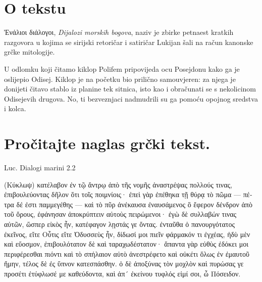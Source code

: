


\section*{O tekstu}

Ἐνάλιοι διάλογοι, \textit{Dijalozi morskih bogova}, naziv je zbirke petnaest kratkih razgovora u kojima se sirijski retoričar i satiričar Lukijan šali na račun kanonske grčke mitologije.

U odlomku koji čitamo kiklop Polifem pripovijeda ocu Posejdonu kako ga je oslijepio Odisej. Kiklop je na početku bio prilično samouvjeren: za njega je donijeti čitavo stablo iz planine tek sitnica, isto kao i obračunati se s nekolicinom Odisejevih drugova. No, ti bezveznjaci nadmudrili su ga pomoću opojnog sredstva i kolca.



\section*{Pročitajte naglas grčki tekst.}

Luc. Dialogi marini 2.2


\medskip


{\large

\begin{greek}

\noindent (Κύκλωψ) κατέλαβον ἐν τῷ ἄντρῳ ἀπὸ τῆς νομῆς ἀναστρέψας πολλούς τινας, ἐπιβουλεύοντας δῆλον ὅτι τοῖς ποιμνίοις· ἐπεὶ γὰρ ἐπέθηκα τῇ θύρᾳ τὸ πῶμα — πέτρα δέ ἐστι παμμεγέθης — καὶ τὸ πῦρ ἀνέκαυσα ἐναυσάμενος ὃ ἔφερον δένδρον ἀπὸ τοῦ ὄρους, ἐφάνησαν ἀποκρύπτειν αὑτοὺς πειρώμενοι· ἐγὼ δὲ συλλαβών τινας αὐτῶν, ὥσπερ εἰκὸς ἦν, κατέφαγον λῃστάς γε ὄντας. ἐνταῦθα ὁ πανουργότατος ἐκεῖνος, εἴτε Οὖτις εἴτε Ὀδυσσεὺς ἦν, δίδωσί μοι πιεῖν φάρμακόν τι ἐγχέας, ἡδὺ μὲν καὶ εὔοσμον, ἐπιβουλότατον δὲ καὶ ταραχωδέστατον· ἅπαντα γὰρ εὐθὺς ἐδόκει μοι περιφέρεσθαι πιόντι καὶ τὸ σπήλαιον αὐτὸ ἀνεστρέφετο καὶ οὐκέτι ὅλως ἐν ἐμαυτοῦ ἤμην, τέλος δὲ ἐς ὕπνον κατεσπάσθην. ὁ δὲ ἀποξύνας τὸν μοχλὸν καὶ πυρώσας γε προσέτι ἐτύφλωσέ με καθεύδοντα, καὶ ἀπ´ ἐκείνου τυφλός εἰμί σοι, ὦ Πόσειδον.


\end{greek}

}


